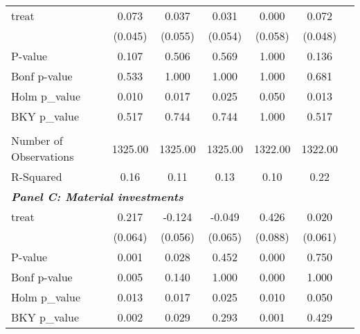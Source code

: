 {\begin{tabular}{l*{6}{c}}
treat               &       0.073         &       0.037         &       0.031         &       0.000         &       0.072         \\
&     (0.045)         &     (0.055)         &     (0.054)         &     (0.058)         &     (0.048)         \\
\hline
P-value             &       0.107         &       0.506         &       0.569         &       1.000         &       0.136         \\
Bonf p-value        &       0.533         &       1.000         &       1.000         &       1.000         &       0.681         \\
Holm p\_value        &       0.010         &       0.017         &       0.025         &       0.050         &       0.013         \\
BKY p\_value         &       0.517         &       0.744         &       0.744         &       1.000         &       0.517         \\
&                     &                     &                     &                     &                     \\
Number of Observations&     1325.00         &     1325.00         &     1325.00         &     1322.00         &     1322.00         \\
R-Squared           &        0.16         &        0.11         &        0.13         &        0.10         &        0.22         \\
\hline
\multicolumn{6}{l}{\linebreak \textbf{\textit{Panel C: Material investments}}} \\
treat               &       0.217\sym{***}&      -0.124\sym{*}  &      -0.049         &       0.426\sym{***}&       0.020         \\
&     (0.064)         &     (0.056)         &     (0.065)         &     (0.088)         &     (0.061)         \\
\hline
P-value             &       0.001         &       0.028         &       0.452         &       0.000         &       0.750         \\
Bonf p-value        &       0.005         &       0.140         &       1.000         &       0.000         &       1.000         \\
Holm p\_value        &       0.013         &       0.017         &       0.025         &       0.010         &       0.050         \\
BKY p\_value         &       0.002         &       0.029         &       0.293         &       0.001         &       0.429         \\

\end{tabular}}
